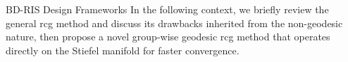 \begin{section}{BD-RIS Design Frameworks}
	In the following context, we briefly review the general \gls{rcg} method and discuss its drawbacks inherited from the non-geodesic nature, then propose a novel group-wise geodesic \gls{rcg} method that operates directly on the Stiefel manifold for faster convergence.


\end{section}
